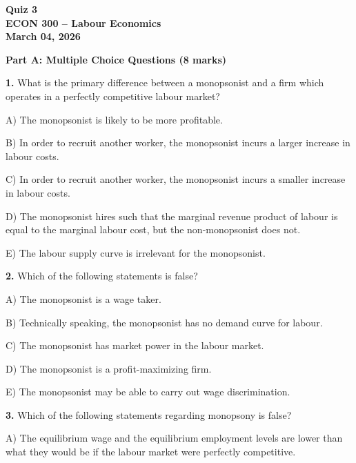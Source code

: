 \documentclass[12pt]{article}
\begin{document}
\begin{center}
\Large \textbf{Quiz 3\\ \vspace{0.6em}ECON 300 -- Labour Economics}\\

\vspace{0.6em}
\normalsize \textbf{March 04, 2026}
\end{center}

\vspace{0.5em}



\textbf{Part A: Multiple Choice Questions (8 marks)}

\textbf{1.} What is the primary difference between a monopsonist and a firm which operates in a perfectly competitive labour market?

A) The monopsonist is likely to be more profitable.

B) In order to recruit another worker, the monopsonist incurs a larger increase in labour costs.

C) In order to recruit another worker, the monopsonist incurs a smaller increase in labour costs.

D) The monopsonist hires such that the marginal revenue product of labour is equal to the marginal labour cost, but the non-monopsonist does not.

E) The labour supply curve is irrelevant for the monopsonist.

\vspace{1em}

\textbf{2.} Which of the following statements is false?

A) The monopsonist is a wage taker.

B) Technically speaking, the monopsonist has no demand curve for labour.

C) The monopsonist has market power in the labour market.

D) The monopsonist is a profit-maximizing firm.

E) The monopsonist may be able to carry out wage discrimination.

\vspace{1em}

\textbf{3.} Which of the following statements regarding monopsony is false?

A) The equilibrium wage and the equilibrium employment levels are lower than what they would be if the labour market were perfectly competitive.
\end{document}
